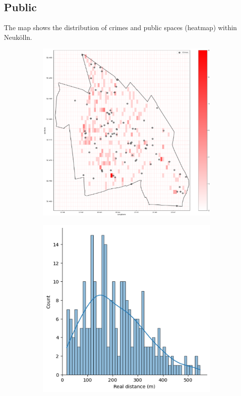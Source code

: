 \subsection{Public}
The map shows the distribution of crimes and public spaces (heatmap) within Neukölln. 
\begin{figure}[h]
    \centering
    \begin{subfigure}[b]{0.45\textwidth}
        \centering
        \includegraphics[width=\textwidth]{./figures/Gerard/public.png}
        \caption{}
        \label{fig:image1}
    \end{subfigure}
    \hfill
    \begin{subfigure}[b]{0.45\textwidth}
        \centering
        \includegraphics[width=\textwidth]{./figures/Gerard/public_1.png}
        \caption{}
        \label{fig:image2}
    \end{subfigure}


\end{figure}
